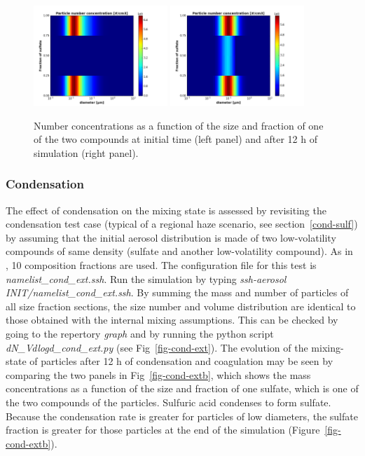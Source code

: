 \documentclass[a4paper,11pt]{article}
\begin{document}
\begin{figure}[H]
        \begin{center}
                \includegraphics[angle=0,width=0.45\textwidth]{../graph/figure_ref/coag_ext_init.png}
                \includegraphics[angle=0,width=0.45\textwidth]{../graph/figure_ref/coag_ext_out.png}
        \end{center}
\caption{Number concentrations as a function of the size and fraction of one of the
two compounds at initial time (left panel) and after 12 h of simulation (right panel).}
\label{fig-coag-extb}
\end{figure}
 
\subsubsection{Condensation}

The effect of 
condensation on the mixing state is assessed by revisiting the condensation
test case (typical of a regional haze scenario, see section~\ref{cond-sulf}) by assuming
that the initial aerosol distribution is made of two low-volatility compounds
of same density (sulfate and another low-volatility compound).
As in \cite{zhu2015size}, 10 composition fractions are used.
The configuration file for this test is {\it{namelist\_cond\_ext.ssh}}.
Run the simulation by typing {\it{ssh-aerosol INIT/namelist\_cond\_ext.ssh}}.
By summing the mass and number of particles of all size fraction sections, the
size number and volume distribution are identical to those obtained with the
internal mixing assumptions. This can be checked by going to the repertory
{\it{graph}} and by running the python script {\it{dN\_Vdlogd\_cond\_ext.py}}
(see Fig~\ref{fig-cond-ext}).
The evolution of the mixing-state of particles after 12 h of condensation and coagulation may
be seen by comparing the two panels in Fig~\ref{fig-cond-extb}, which shows
the mass concentrations as a function of the size and fraction of one
sulfate, which is one of the
two compounds of the particles. 
Sulfuric acid condenses to form
sulfate. Because the condensation rate is greater for particles of
low diameters, the sulfate fraction is greater for those particles at the end
of the simulation (Figure~\ref{fig-cond-extb}).
\end{document}
